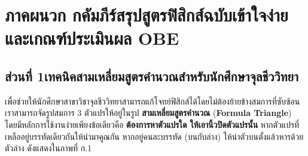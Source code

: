 \chapter*{ภาคผนวก ก\quad คัมภีร์สรุปสูตรฟิสิกส์ฉบับเข้าใจง่ายและเกณฑ์ประเมินผล OBE}

\section*{ส่วนที่ 1\quad เทคนิคสามเหลี่ยมสูตรคำนวณสำหรับนักศึกษาจุลชีววิทยา}

เพื่อช่วยให้นักศึกษาสาขาวิชาจุลชีววิทยาสามารถแก้โจทย์ฟิสิกส์ได้โดยไม่ต้องย้ายข้างสมการที่ซับซ้อน เราสามารถจัดรูปสมการ 3 ตัวแปรให้อยู่ในรูป \textbf{สามเหลี่ยมสูตรคำนวณ} (\textbf{Formula Triangle}) โดยมีหลักการใช้งานง่ายเพียงข้อเดียวคือ \textbf{ต้องการหาตัวแปรใด ให้เอานิ้วปิดตัวแปรนั้น} หากตัวแปรที่เหลืออยู่บรรทัดเดียวกันให้นำมาคูณกัน หากอยู่คนละบรรทัด (บนกับล่าง) ให้นำตัวบนตั้งแล้วหารด้วยตัวล่าง ดังแสดงใน\mbox{ภาพที่} ก.1

